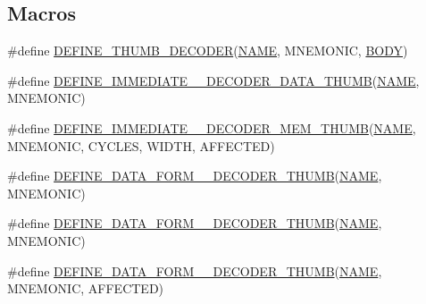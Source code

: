 \subsection*{Macros}
\begin{DoxyCompactItemize}
\item 
\#define \mbox{\hyperlink{decoder-thumb_8c_a44d34ec3fd7c2c2ee51ff5966678c86e}{D\+E\+F\+I\+N\+E\+\_\+\+T\+H\+U\+M\+B\+\_\+\+D\+E\+C\+O\+D\+ER}}(\mbox{\hyperlink{inflate_8h_a164ea0159d5f0b5f12a646f25f99eceaa67bc2ced260a8e43805d2480a785d312}{N\+A\+ME}},  M\+N\+E\+M\+O\+N\+IC,  \mbox{\hyperlink{gzlog_8c_aa6bdf6a6d9916c343e1e17774d84a156}{B\+O\+DY}})
\item 
\#define \mbox{\hyperlink{decoder-thumb_8c_a57aa04c5e278e74d252ea14947824828}{D\+E\+F\+I\+N\+E\+\_\+\+I\+M\+M\+E\+D\+I\+A\+T\+E\+\_\+\_\+\+D\+E\+C\+O\+D\+E\+R\+\_\+\+D\+A\+T\+A\+\_\+\+T\+H\+U\+MB}}(\mbox{\hyperlink{inflate_8h_a164ea0159d5f0b5f12a646f25f99eceaa67bc2ced260a8e43805d2480a785d312}{N\+A\+ME}},  M\+N\+E\+M\+O\+N\+IC)
\item 
\#define \mbox{\hyperlink{decoder-thumb_8c_a2012fa2b9f2dc113af070a559b771149}{D\+E\+F\+I\+N\+E\+\_\+\+I\+M\+M\+E\+D\+I\+A\+T\+E\+\_\+\_\+\+D\+E\+C\+O\+D\+E\+R\+\_\+\+M\+E\+M\+\_\+\+T\+H\+U\+MB}}(\mbox{\hyperlink{inflate_8h_a164ea0159d5f0b5f12a646f25f99eceaa67bc2ced260a8e43805d2480a785d312}{N\+A\+ME}},  M\+N\+E\+M\+O\+N\+IC,  C\+Y\+C\+L\+ES,  W\+I\+D\+TH,  A\+F\+F\+E\+C\+T\+ED)
\item 
\#define \mbox{\hyperlink{decoder-thumb_8c_a172d2735fdfd8af9a99ae5573bae8e15}{D\+E\+F\+I\+N\+E\+\_\+\+D\+A\+T\+A\+\_\+\+F\+O\+R\+M\+\_\+\_\+\+D\+E\+C\+O\+D\+E\+R\+\_\+\+T\+H\+U\+MB}}(\mbox{\hyperlink{inflate_8h_a164ea0159d5f0b5f12a646f25f99eceaa67bc2ced260a8e43805d2480a785d312}{N\+A\+ME}},  M\+N\+E\+M\+O\+N\+IC)
\item 
\#define \mbox{\hyperlink{decoder-thumb_8c_a69fb22d6b74f08be3a1b681faf150d43}{D\+E\+F\+I\+N\+E\+\_\+\+D\+A\+T\+A\+\_\+\+F\+O\+R\+M\+\_\+\_\+\+D\+E\+C\+O\+D\+E\+R\+\_\+\+T\+H\+U\+MB}}(\mbox{\hyperlink{inflate_8h_a164ea0159d5f0b5f12a646f25f99eceaa67bc2ced260a8e43805d2480a785d312}{N\+A\+ME}},  M\+N\+E\+M\+O\+N\+IC)
\item 
\#define \mbox{\hyperlink{decoder-thumb_8c_a2d840a1d57010bf5110f5c095fe9a6a8}{D\+E\+F\+I\+N\+E\+\_\+\+D\+A\+T\+A\+\_\+\+F\+O\+R\+M\+\_\+\_\+\+D\+E\+C\+O\+D\+E\+R\+\_\+\+T\+H\+U\+MB}}(\mbox{\hyperlink{inflate_8h_a164ea0159d5f0b5f12a646f25f99eceaa67bc2ced260a8e43805d2480a785d312}{N\+A\+ME}},  M\+N\+E\+M\+O\+N\+IC,  A\+F\+F\+E\+C\+T\+ED)
\item 

\end{DoxyCompactItemize}
